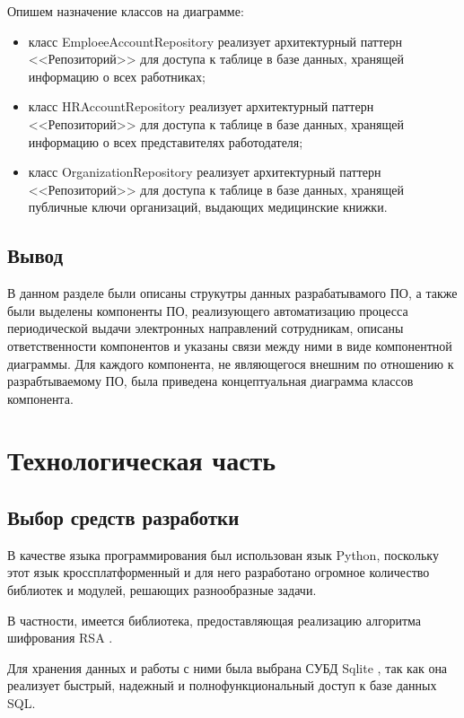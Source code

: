 \documentclass[12pt]{report}
\begin{document}
Опишем назначение классов на диаграмме:

\begin{itemize}  \renewcommand\labelitemi{---} 
    \item класс EmploeeAccountRepository реализует архитектурный паттерн <<Репозиторий>> для доступа к таблице в базе данных, хранящей информацию о всех работниках;
    \item класс HRAccountRepository реализует архитектурный паттерн <<Репозиторий>> для доступа к таблице в базе данных, хранящей информацию о всех представителях работодателя;
    \item класс OrganizationRepository реализует архитектурный паттерн <<Репозиторий>> для доступа к таблице в базе данных, хранящей публичные ключи организаций, выдающих медицинские книжки.
\end{itemize}


\section*{Вывод}
В данном разделе были описаны струкутры данных разрабатывамого ПО, а также были выделены компоненты ПО, реализующего автоматизацию процесса периодической выдачи электронных направлений сотрудникам, описаны ответственности компонентов и указаны связи между ними в виде компонентной диаграммы. Для каждого компонента, не являющегося внешним по отношению к разрабтываемому ПО, была приведена концептуальная диаграмма классов компонента. 

\chapter{Технологическая часть}

\section{Выбор средств разработки}
В качестве языка программирования был использован язык Python, поскольку этот язык кроссплатформенный и для него разработано огромное количество библиотек и модулей, решающих разнообразные задачи. 

В частности, имеется библиотека, предоставляющая реализацию алгоритма шифрования RSA \cite{bib:rsa-lib}.  

Для хранения данных и работы с ними была выбрана СУБД Sqlite \cite{bib:11}, так как она реализует быстрый, надежный и полнофункциональный доступ к базе данных SQL. 
\end{document}
